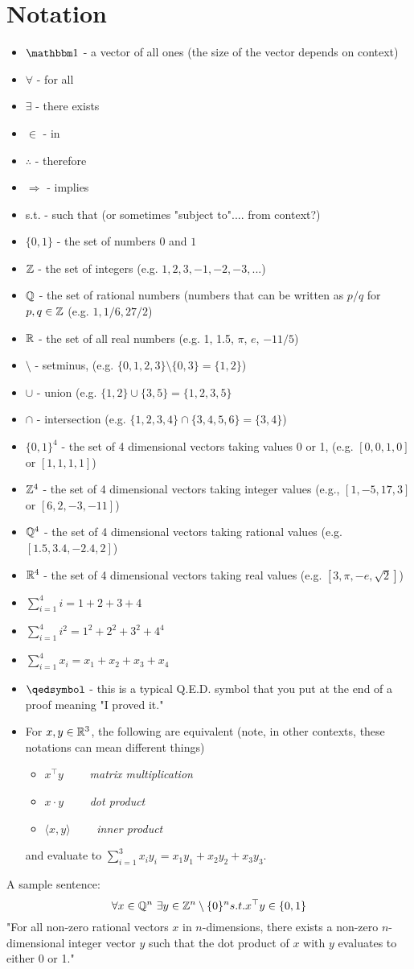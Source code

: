 \documentclass[../open-optimization/open-optimization.tex]{subfiles}
\begin{document}
\section{Notation}
\begin{itemize}
\item $\one$ - a vector of all ones (the size of the vector depends on context)
\item $\forall$ - for all
\item $\exists$ - there exists
\item $\in$ - in
\item $\therefore$ - therefore
\item $\Rightarrow$ - implies
\item s.t.  - such that (or sometimes "subject to".... from context?)
\item $\{0,1\}$ - the set of numbers $0$ and $1$
\item ${\mathbb{Z}}$ - the set of integers (e.g. $1,2,3,-1,-2,-3,...$)
\item ${\mathbb{Q}}$ - the set of rational numbers (numbers that can be written as $p/q$ for $p,q \in {\mathbb{Z}}$ (e.g. $1, 1/6, 27/2$)
\item ${\mathbb{R}}$  - the set of all real numbers (e.g. 1, 1.5, $\pi$, $e$, $-11/5$)
\item $\setminus$ - setminus, (e.g.  $\{0,1,2,3\} \setminus \{0,3\} = \{1,2\}$)
\item $\cup$ - union (e.g.  $\{1,2\} \cup \{3,5\} = \{1,2,3,5\}$
\item $\cap$ - intersection (e.g. $\{1,2,3,4\} \cap \{3,4,5,6\} = \{3,4\}$)
\item $\{0,1\}^4$ - the set of 4 dimensional vectors taking values 0 or 1, (e.g. $[0,0,1,0]$ or $[1,1,1,1]$)
\item ${\mathbb{Z}}^4$ - the set of 4 dimensional vectors taking integer values (e.g., $[1,-5,17,3]$ or $[6 , 2, -3, -11]$)
\item ${\mathbb{Q}}^4$ - the set of 4 dimensional vectors taking rational values (e.g. $[1.5, 3.4, -2.4, 2]$)
\item ${\mathbb{R}}^4$ - the set of 4 dimensional vectors taking real values (e.g. $[3, \pi, -e, \sqrt{2}]$)
\item $\sum_{i=1}^4 i  = 1 + 2 + 3 + 4$
\item $\sum_{i=1}^4 i^2 = 1^2 + 2^2 + 3^2 + 4^4$
\item $\sum_{i=1}^4 x_i = x_1 + x_2 + x_3 + x_4$
\item $\qedsymbol$ - this is a typical Q.E.D. symbol that you put at the end of a proof meaning "I proved it."
\item For $x,y \in {\mathbb{R}}^3$, the following are equivalent (note, in other contexts, these notations can mean different things)
\begin{itemize}
\item $x^\top y$ \ \ \ \ \emph{matrix multiplication}
\item $x \cdot y$ \ \ \ \ \emph{dot product}
\item $\langle x,y\rangle$ \ \ \ \ \emph{inner product}
\end{itemize}
and evaluate to $\sum_{i=1}^3 x_i y_i = x_1 y_1 + x_2 y_2 + x_3 y_3$.
\end{itemize}


A sample sentence:
$$
\forall x \in \Q^n \ \exists y \in \Z^n\setminus \{0\}^n s.t.  x^\top y \in \{0,1\}
$$
"For all non-zero rational vectors $x$ in $n$-dimensions, there exists a non-zero $n$-dimensional integer vector $y$ such that the dot product of $x$ with $y$ evaluates to either 0 or 1."
\end{document}
